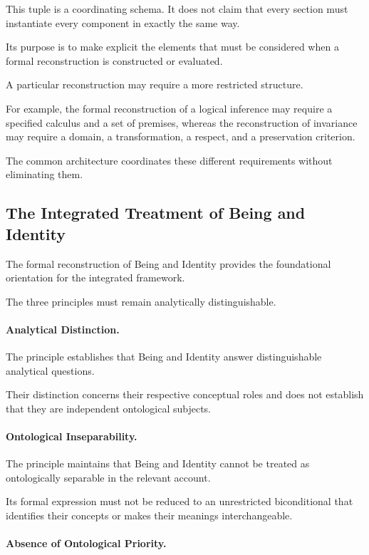 This tuple is a coordinating schema.
It does not claim that every section
must instantiate every component
in exactly the same way.

Its purpose is to make explicit
the elements that must be considered
when a formal reconstruction is
constructed or evaluated.

A particular reconstruction may
require a more restricted structure.

For example, the formal reconstruction
of a logical inference may require
a specified calculus and a set
of premises, whereas the reconstruction
of invariance may require a domain,
a transformation, a respect, and
a preservation criterion.

The common architecture coordinates
these different requirements without
eliminating them.

\subsection{The Integrated Treatment of Being and Identity}

The formal reconstruction of Being
and Identity provides the foundational
orientation for the integrated framework.

The three principles must remain
analytically distinguishable.

\paragraph{Analytical Distinction.}

The principle establishes that
Being and Identity answer distinguishable
analytical questions.

Their distinction concerns their
respective conceptual roles and
does not establish that they are
independent ontological subjects.

\paragraph{Ontological Inseparability.}

The principle maintains that Being
and Identity cannot be treated
as ontologically separable in
the relevant account.

Its formal expression must not
be reduced to an unrestricted
biconditional that identifies
their concepts or makes their
meanings interchangeable.

\paragraph{Absence of Ontological Priority.}


